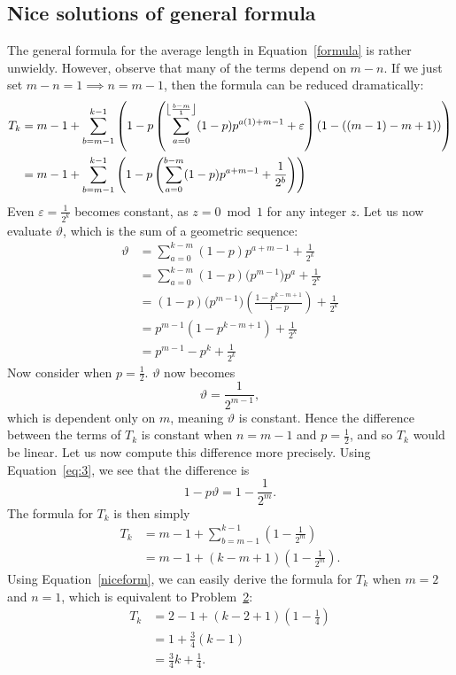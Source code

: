 \subsection{Nice solutions of general formula}
The general formula for the average length in Equation~\ref{formula} is rather unwieldy. However, observe that many of the terms depend on $m-n$. If we just set  $m-n = 1 \implies n = m - 1$, then the formula can be reduced dramatically:
\begin{align}
  T_k &= m-1+\sum _{b=m-1}^{k-1} \left(1-p \left(\sum _{a=0}^{\floor*{\frac{b-m}{1}} } (1-p) p^{a (1)+m-1}+\varepsilon\right) (1-((m-1)-m+1))\right) \nonumber \\
      &= m-1+\sum _{b=m-1}^{k-1} \left(1-p \left(\sum _{a=0}^{b-m} (1-p) p^{a+m-1}+ \frac{1}{2^b} \right) \right) \label{eq:3}
\end{align}
Even $\varepsilon = \frac{1}{2^k}$ becomes constant, as $z = 0 \bmod 1$ for any integer  $z$. Let us now evaluate $\vartheta$, which is the sum of a geometric sequence:
\begin{align*}
  \vartheta &= \sum_{a=0}^{k-m} (1-p)p^{a+m-1} + \frac{1}{2^k} \\
            &= \sum_{a=0}^{k-m} (1-p)\bigl(p^{m-1}\bigr)p^{a} + \frac{1}{2^{k}} \\
            &= (1-p)\bigl(p^{m-1}\bigr)\left(\frac{1-p^{k-m+1}}{1-p}\right) + \frac{1}{2^{k}} \\
            &= p^{m-1}(1-p^{k-m+1}) + \frac{1}{2^{k}} \\
            &= p^{m-1} - p^{k} + \frac{1}{2^{k}}
\end{align*}
Now consider when $p = \frac{1}{2}$. $\vartheta$ now becomes \[
  \vartheta = \frac{1}{2^{m-1}}
,\] which is dependent only on $m$, meaning $\vartheta$ is constant. Hence the difference between the terms of $T_k$ is constant when $n = m-1$ and $p = \frac{1}{2}$, and so $T_k$ would be linear. Let us now compute this difference more precisely. Using Equation~\ref{eq:3}, we see that the difference is \[
  1-p\vartheta = 1-\frac{1}{2^{m}}
.\] The formula for $T_k$ is then simply 
\begin{align}
  T_k &= m-1 + \sum_{b=m-1}^{k-1} \left(1-\frac{1}{2^{m}}\right) \nonumber \\
      &= m-1 + (k-m+1)\left(1 - \frac{1}{2^{m}}\right). \label{niceform}
\end{align}
Using Equation~\ref{niceform}, we can easily derive the formula for $T_k$ when $m = 2$ and $n = 1$, which is equivalent to Problem~\hyperlink{p2}{2}: 
\begin{align*}
  T_k &= 2 - 1 + (k-2+1)\left(1 - \frac{1}{4}\right) \\
      &= 1 + \frac{3}{4}(k-1) \\
      &= \frac{3}{4}k + \frac{1}{4}.
\end{align*}
